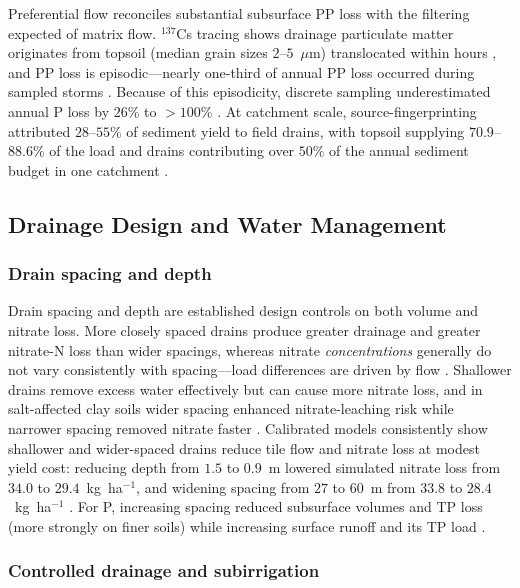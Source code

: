 Preferential flow reconciles substantial subsurface PP loss with the
filtering expected of matrix flow. $^{137}$Cs tracing shows drainage
particulate matter originates from topsoil (median grain sizes $2$--$5$~$\mu$m)
translocated within hours \parencite{Laubel1999,Uusitalo2001}, and PP loss is
episodic---nearly one-third of annual PP loss occurred during sampled storms
\parencite{Laubel1999,Grant1996}. Because of this episodicity, discrete
sampling underestimated annual P loss by $26\%$ to $>100\%$
\parencite{Grant1996}. At catchment scale, source-fingerprinting attributed
$28$--$55\%$ of sediment yield to field drains, with topsoil supplying
$70.9$--$88.6\%$ of the load and drains contributing over $50\%$ of the annual
sediment budget in one catchment \parencite{Walling2002,Chapman2005}.

\subsection{Drainage Design and Water Management}

\subsubsection{Drain spacing and depth}

Drain spacing and depth are established design controls on both volume and
nitrate loss. More closely spaced drains produce greater drainage and greater
nitrate-N loss than wider spacings, whereas nitrate \emph{concentrations}
generally do not vary consistently with spacing---load differences are driven
by flow \parencite{Kladivko2021,Kladivko2004}. Shallower drains remove excess
water effectively but can cause more nitrate loss, and in salt-affected clay
soils wider spacing enhanced nitrate-leaching risk while narrower spacing
removed nitrate faster \parencite{Hashemi2020,Singh2002,Singh2001c,Singh2007}.
Calibrated models consistently show shallower and wider-spaced drains reduce
tile flow and nitrate loss at modest yield cost: reducing depth from $1.5$ to
$0.9$~m lowered simulated nitrate loss from $34.0$ to $29.4$~kg~ha$^{-1}$, and
widening spacing from $27$ to $60$~m from $33.8$ to $28.4$~kg~ha$^{-1}$
\parencite{Moriasi2013,Nangia2010c,Davis2000,Hwang2024}. For P, increasing
spacing reduced subsurface volumes and TP loss (more strongly on finer soils)
while increasing surface runoff and its TP load \parencite{Morrison2013}.

\subsubsection{Controlled drainage and subirrigation}

